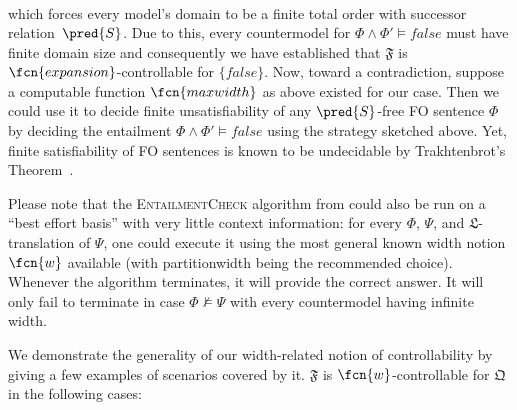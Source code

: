 \begin{remark}
$$\begin{array}{r}
\end{array}
$$
which forces every model's domain to be a finite total order with successor relation~$\pred{S}$. Due to this, every countermodel for $\Phi \wedge \Phi' \models \mathit{false}$ must have finite domain size and consequently we have established that $\mathfrak{F}$ is $\fcn{expansion}$-controllable for $\{\mathit{false}\}$. Now, toward a contradiction, suppose a computable function $\fcn{maxwidth}$ as above existed for our case. Then we could use it to decide finite unsatisfiability of any $\pred{S}$-free FO sentence $\Phi$ by deciding the entailment $\Phi \wedge \Phi' \models \mathit{false}$ using the strategy sketched above. Yet, finite satisfiability of FO sentences is known to be undecidable by Trakhtenbrot's Theorem~\cite{trakhtenbrot50}.
\end{remark}

Please note that the \textsc{EntailmentCheck} algorithm from  could also be run on a ``best effort basis'' with very little context information: for every $\Phi$, $\Psi$, and $\mathfrak{L}$-translation of $\Psi$, one could execute it using the most general known width notion $\fcn{w}$ available (with partitionwidth being the recommended choice). Whenever the algorithm terminates, it will provide the correct answer. It will only fail to terminate in case $\Phi \not\models \Psi$ with every countermodel having infinite width. 

We demonstrate the generality of our width-related notion of control\-la\-bility by giving a few examples of scenarios covered by it. $\mathfrak{F}$ is $\fcn{w}$-controllable for $\mathfrak{Q}$ in the following cases:


